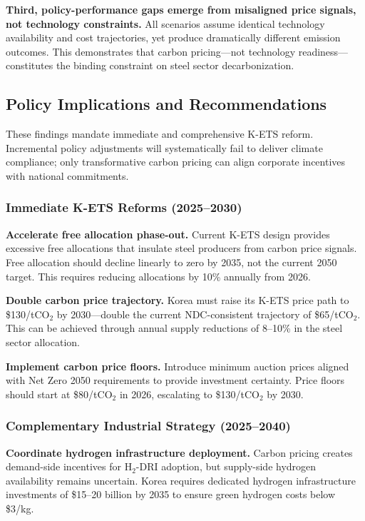 \documentclass[preprint,1p,authoryear]{elsarticle}
\begin{document}
\textbf{Third, policy-performance gaps emerge from misaligned price signals, not technology constraints.} All scenarios assume identical technology availability and cost trajectories, yet produce dramatically different emission outcomes. This demonstrates that carbon pricing—not technology readiness—constitutes the binding constraint on steel sector decarbonization.

\subsection{Policy Implications and Recommendations}

These findings mandate immediate and comprehensive K-ETS reform. Incremental policy adjustments will systematically fail to deliver climate compliance; only transformative carbon pricing can align corporate incentives with national commitments.

\subsubsection{Immediate K-ETS Reforms (2025--2030)}

\textbf{Accelerate free allocation phase-out.} Current K-ETS design provides excessive free allocations that insulate steel producers from carbon price signals. Free allocation should decline linearly to zero by 2035, not the current 2050 target. This requires reducing allocations by 10\% annually from 2026.

\textbf{Double carbon price trajectory.} Korea must raise its K-ETS price path to \$130/tCO$_2$ by 2030—double the current NDC-consistent trajectory of \$65/tCO$_2$. This can be achieved through annual supply reductions of 8--10\% in the steel sector allocation.

\textbf{Implement carbon price floors.} Introduce minimum auction prices aligned with Net Zero 2050 requirements to provide investment certainty. Price floors should start at \$80/tCO$_2$ in 2026, escalating to \$130/tCO$_2$ by 2030.

\subsubsection{Complementary Industrial Strategy (2025--2040)}

\textbf{Coordinate hydrogen infrastructure deployment.} Carbon pricing creates demand-side incentives for H$_2$-DRI adoption, but supply-side hydrogen availability remains uncertain. Korea requires dedicated hydrogen infrastructure investments of \$15--20 billion by 2035 to ensure green hydrogen costs below \$3/kg.
\end{document}
